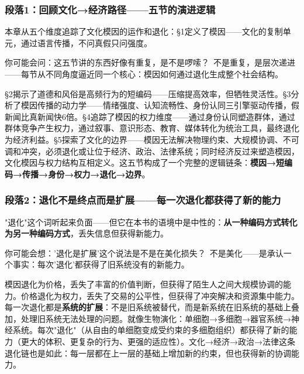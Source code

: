 \documentclass[../main.tex]{subfiles}
\begin{document}
	\subsubsection*{段落1：回顾文化→经济路径——五节的演进逻辑}

	本章从五个维度追踪了文化模因的运作和退化：§1定义了模因——文化的复制单元，通过语言传播，不问真假只问强度。

	\begin{tcolorbox}[colback=yellow!5, title=\textit{读者行为预测}]

		你可能会问：这五节讲的东西好像有重复，是不是啰嗦？\ 不是重复，是层次递进——每节从不同角度逼近同一个核心：模因如何通过退化生成整个社会结构。

	\end{tcolorbox}

§2揭示了道德和风俗是高频行为的短编码——压缩提高效率，但牺牲灵活性。§3分析了模因传播的动力学——情绪强度、认知流畅性、身份认同三引擎驱动传播，假新闻比真新闻快6倍。§4追踪了模因的权力维度——通过身份认同塑造群体，通过群体竞争产生权力，通过叙事、意识形态、教育、媒体转化为统治工具，最终退化为经济利益。§5探索了文化的边界——模因无法解决物理约束、大规模协调、不可调和冲突，必须退化或让位于经济、政治、法律系统；同时经济反过来塑造模因，文化模因与权力结构互相定义。这五节构成了一个完整的逻辑链条：\textbf{模因→短编码→传播→身份→权力→退化→边界}。

	\subsubsection*{段落2：退化不是终点而是扩展——每一次退化都获得了新的能力}

	"退化"这个词听起来负面——但它在本书的语境中是中性的：\textbf{从一种编码方式转化为另一种编码方式}，丢失信息但获得新能力。

	\begin{tcolorbox}[colback=yellow!5, title=\textit{读者行为预测}]

		你可能会想：'退化是扩展'这个说法是不是在美化损失？\ 不是美化——是承认一个事实：每次'退化'都获得了旧系统没有的新能力。

	\end{tcolorbox}

模因退化为价格，丢失了丰富的价值判断，但获得了陌生人之间大规模协调的能力。价格退化为权力，丢失了交易的公平性，但获得了冲突解决和资源集中能力。每一次退化都是\textbf{系统的扩展}：不是旧系统被替代，而是新系统在旧系统的基础上叠加，处理旧系统无法处理的问题。就像生物演化：单细胞→多细胞→器官系统→神经系统。每次"退化"（从自由的单细胞变成受约束的多细胞组织）都获得了新的能力（更大的体积、更复杂的行为、更强的适应性）。文化→经济→政治→法律这条退化链也是如此：每一层都在上一层的基础上增加新的约束，但也获得新的协调能力。
\end{document}

